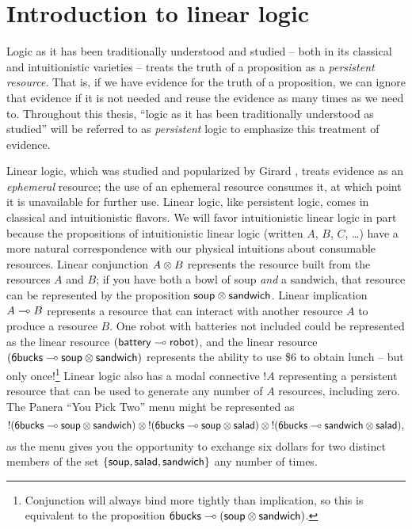 \section{Introduction to linear logic}
\label{sec:introlinlog}

Logic as it has been traditionally understood and studied -- both in
its classical and intuitionistic varieties -- treats the truth of a
proposition as a {\it persistent resource}. That is, if we have
evidence for the truth of a proposition, we can ignore that evidence
if it is not needed and reuse the evidence as many times as we need
to. Throughout this thesis, ``logic as it has been traditionally
understood as studied'' will be referred to as {\it persistent} logic
to emphasize this treatment of evidence. 

Linear logic, which was studied and
popularized by Girard \cite{girard87linear},
treats evidence as an {\it ephemeral} resource; the use of an
ephemeral resource consumes it, at which point it is unavailable for
further use.  Linear logic, like persistent logic, comes in classical
and intuitionistic flavors. We will favor intuitionistic linear logic
in part because the propositions of intuitionistic linear logic
(written $A$, $B$, $C$, \ldots) have a more natural correspondence
with our physical intuitions about consumable resources. Linear
conjunction $A \otimes B$ represents the resource built from the
resources $A$ and $B$; if you have both a bowl of soup {\it and} a
sandwich, that resource can be represented by the proposition ${\sf
  soup} \otimes {\sf sandwich}$. Linear implication $A \multimap B$
represents a resource that can interact with another resource $A$ to
produce a resource $B$. One robot with batteries not included could be
represented as the linear resource $({\sf battery} \multimap {\sf
  robot})$, and the linear resource $({\sf 6bucks} \multimap {\sf soup}
\otimes {\sf sandwich})$ represents the ability to use \$6 to obtain
lunch -- but only once!\footnote{Conjunction will always bind more
  tightly than implication, so this is equivalent to the proposition
  ${\sf 6bucks} \multimap ({\sf soup} \otimes {\sf sandwich})$.} Linear
logic also has a modal connective ${!}A$ representing a persistent
resource that can be
used to generate any number of $A$ resources, including zero. The
Panera ``You Pick Two'' menu might be represented as
\[ {!}({\sf 6bucks} \multimap {\sf soup} \otimes {\sf sandwich}) \otimes
{!}({\sf 6bucks} \multimap {\sf soup} \otimes {\sf salad}) \otimes
{!}({\sf 6bucks} \multimap {\sf sandwich} \otimes {\sf salad}),\] as the
menu gives you the opportunity to exchange six dollars for two
distinct members of the set $\{ {\sf soup}, {\sf salad}, {\sf
  sandwich} \}$ any number of times.

